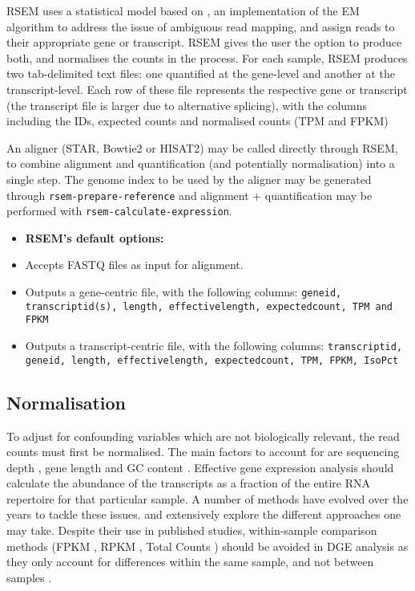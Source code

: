 RSEM uses a statistical model based on \cite{li2010rna}, an implementation of the EM algorithm to address the issue of ambiguous read mapping, and assign reads to their appropriate gene or transcript. RSEM gives the user the option to produce both, and normalises the counts in the process. For each sample, RSEM produces two tab-delimited text files: one quantified at the gene-level and another at the transcript-level. Each row of these file represents the respective gene or transcript (the transcript file is larger due to alternative splicing), with the columns including the IDs, expected counts and normalised counts (TPM and FPKM)

An aligner (STAR, Bowtie2 or HISAT2) may be called directly through RSEM, to combine alignment and quantification (and potentially normalisation) into a single step. The genome index to be used by the aligner may be generated through \texttt{rsem-prepare-reference} and alignment + quantification may be performed with \texttt{rsem-calculate-expression}.

\begin{itemize}\itemsep0em
\item[] \textbf{RSEM's default options:}
\item Accepts FASTQ files as input for alignment.
\item Outputs a gene-centric file, with the following columns: \texttt{gene\textunderscore id, transcript\textunderscore id(s), length, effective\textunderscore length, expected\textunderscore count, TPM and FPKM}
\item Outputs a transcript-centric file, with the following columns: \texttt{transcript\textunderscore id, gene\textunderscore id, length, effective\textunderscore length, expected\textunderscore count, TPM, FPKM, IsoPct}
\end{itemize}

\subsection{Normalisation}

To adjust for confounding variables which are not biologically relevant, the read counts must first be normalised. The main factors to account for are sequencing depth \citep{robinson2010scaling}, gene length \citep{oshlack2009transcript} and GC content \citep{risso2011gc}. Effective gene expression analysis should calculate the abundance of the transcripts as a fraction of the entire RNA repertoire for that particular sample. A number of methods have evolved over the years to tackle these issues. \cite{dillies2013comprehensive} and \cite{bullard2010evaluation} extensively explore the different approaches one may take. Despite their use in published studies, within-sample comparison methods (FPKM \citep{trapnell2010transcript}, RPKM \citep{mortazavi2008mapping}, Total Counts \citep{dillies2013comprehensive}) should be avoided in \ac{DGE} analysis as they only account for differences within the same sample, and not between samples \citep{dundar2015introduction}.

